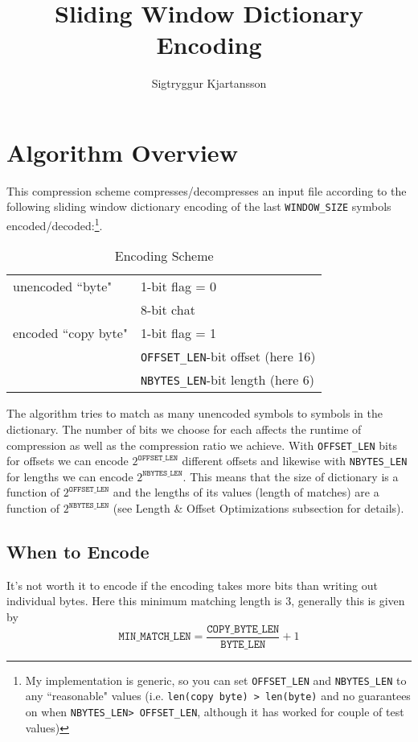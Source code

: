 \documentclass[a4paper]{article}
\title{Sliding Window Dictionary Encoding}
\author{Sigtryggur Kjartansson}
\begin{document}
\maketitle
\tableofcontents

\section{Algorithm Overview}
This compression scheme compresses/decompresses an input file according to the following sliding window dictionary encoding of the last \texttt{WINDOW\_SIZE} symbols encoded/decoded:\footnote{My implementation is generic, so you can set \texttt{OFFSET\_LEN} and \texttt{NBYTES\_LEN} to any ``reasonable" values (i.e. \texttt{len(copy byte) > len(byte)} and no guarantees on when \texttt{NBYTES\_LEN> OFFSET\_LEN}, although it has worked for couple of test values)}.

\begin{table}[H]
\centering
\begin{tabular}{|l||l|} 
\hline
unencoded ``byte" & 1-bit flag = 0\\
 & 8-bit chat \\\hline
encoded ``copy byte" & 1-bit flag = 1\\
 & \texttt{OFFSET\_LEN}-bit offset (here 16)\\
  & \texttt{NBYTES\_LEN}-bit length (here 6)\\
  \hline
\end{tabular}
\caption{Encoding Scheme}
\end{table}

The algorithm tries to match as many unencoded symbols to symbols in the dictionary.
The number of bits we choose for each affects the runtime of compression as well as the compression ratio we achieve. With \texttt{OFFSET\_LEN} bits for offsets we can encode \(2^\texttt{OFFSET\_LEN}\) different offsets and likewise with \texttt{NBYTES\_LEN} for lengths we can encode \(2^\texttt{NBYTES\_LEN}\).
This means that the size of dictionary is a function of \(2^\texttt{OFFSET\_LEN}\) and the lengths of its values (length of matches) are a function of \(2^\texttt{NBYTES\_LEN}\) (see Length \& Offset Optimizations subsection for details).

\subsection{When to Encode}
  It's not worth it to encode if the encoding takes more bits than writing out individual  bytes. Here this minimum matching length is 3, generally this is given by  
  \[\texttt{MIN\_MATCH\_LEN}=\frac{\texttt{COPY\_BYTE\_LEN}}{\texttt{BYTE\_LEN}} + 1 \]
  
\end{document}
